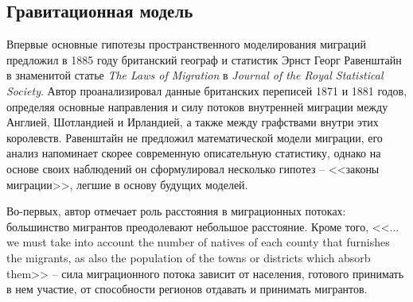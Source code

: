 \documentclass[a4paper,12pt]{article}
\begin{document}
\subsection{Гравитационная модель}

Впервые основные гипотезы пространственного моделирования миграций предложил в 1885 году британский географ и статистик Эрнст Георг Равенштайн в знаменитой статье \emph{The Laws of Migration} в \emph{Journal of the Royal Statistical Society}. \citep{ravenstein_laws_1885} Автор проанализировал данные британских переписей 1871 и 1881 годов, определяя основные направления и силу потоков внутренней миграции между Англией, Шотландией и Ирландией, а также между графствами внутри этих королевств. Равенштайн не предложил математической модели миграции, его анализ напоминает скорее современную описательную статистику, однако на основе своих наблюдений он сформулировал несколько гипотез -- <<законы миграции>>, легшие в основу будущих моделей.

Во-первых, автор отмечает роль расстояния в миграционных потоках: большинство мигрантов преодолевают небольшое расстояние. Кроме того, <<... we must take into account the number of natives of each county that furnishes the migrants, as also the population of the towns or districts which absorb them>> -- 
сила миграционного потока зависит от населения, готового принимать в нем участие, от способности регионов отдавать и принимать мигрантов.
\end{document}
